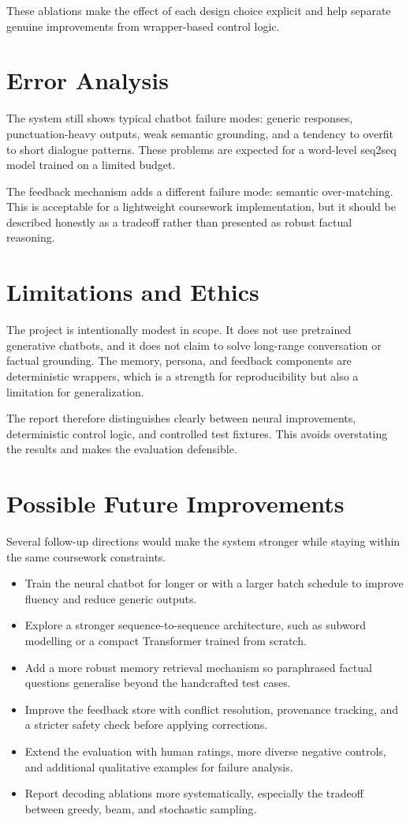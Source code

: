 \documentclass[11pt,a4paper]{article}
\begin{document}
These ablations make the effect of each design choice explicit and help separate genuine improvements from wrapper-based control logic.

\section{Error Analysis}
The system still shows typical chatbot failure modes: generic responses, punctuation-heavy outputs, weak semantic grounding, and a tendency to overfit to short dialogue patterns. These problems are expected for a word-level seq2seq model trained on a limited budget.

The feedback mechanism adds a different failure mode: semantic over-matching. This is acceptable for a lightweight coursework implementation, but it should be described honestly as a tradeoff rather than presented as robust factual reasoning.

\section{Limitations and Ethics}
The project is intentionally modest in scope. It does not use pretrained generative chatbots, and it does not claim to solve long-range conversation or factual grounding. The memory, persona, and feedback components are deterministic wrappers, which is a strength for reproducibility but also a limitation for generalization.

The report therefore distinguishes clearly between neural improvements, deterministic control logic, and controlled test fixtures. This avoids overstating the results and makes the evaluation defensible.

\section{Possible Future Improvements}
Several follow-up directions would make the system stronger while staying within the same coursework constraints.

\begin{itemize}[leftmargin=*]
	\item Train the neural chatbot for longer or with a larger batch schedule to improve fluency and reduce generic outputs.
	\item Explore a stronger sequence-to-sequence architecture, such as subword modelling or a compact Transformer trained from scratch.
	\item Add a more robust memory retrieval mechanism so paraphrased factual questions generalise beyond the handcrafted test cases.
	\item Improve the feedback store with conflict resolution, provenance tracking, and a stricter safety check before applying corrections.
	\item Extend the evaluation with human ratings, more diverse negative controls, and additional qualitative examples for failure analysis.
	\item Report decoding ablations more systematically, especially the tradeoff between greedy, beam, and stochastic sampling.
\end{itemize}
\end{document}

